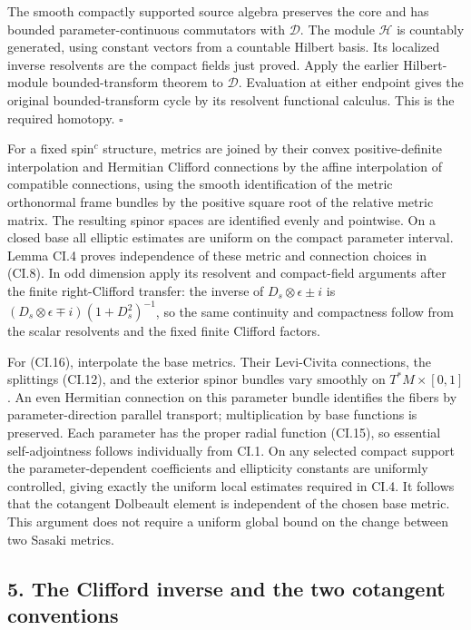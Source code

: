 \documentclass[
  11pt,
]{article}
\begin{document}
The smooth compactly supported source algebra preserves the core and has
bounded parameter-continuous commutators with \(\mathcal D\). The module
\(\mathcal H\) is countably generated, using constant vectors from a
countable Hilbert basis. Its localized inverse resolvents are the
compact fields just proved. Apply the earlier Hilbert-module
bounded-transform theorem to \(\mathcal D\). Evaluation at either
endpoint gives the original bounded-transform cycle by its resolvent
functional calculus. This is the required homotopy. \(\square\)

For a fixed spin\(^{c}\) structure, metrics are joined by their convex
positive-definite interpolation and Hermitian Clifford connections by
the affine interpolation of compatible connections, using the smooth
identification of the metric orthonormal frame bundles by the positive
square root of the relative metric matrix. The resulting spinor spaces
are identified evenly and pointwise. On a closed base all elliptic
estimates are uniform on the compact parameter interval. Lemma CI.4
proves independence of these metric and connection choices in (CI.8). In
odd dimension apply its resolvent and compact-field arguments after the
finite right-Clifford transfer: the inverse of
\(D_s\otimes\epsilon\pm i\) is
\((D_s\otimes\epsilon\mp i)(1+D_s^2)^{-1}\), so the same continuity and
compactness follow from the scalar resolvents and the fixed finite
Clifford factors.

For (CI.16), interpolate the base metrics. Their Levi-Civita
connections, the splittings (CI.12), and the exterior spinor bundles
vary smoothly on \(T^*M\times[0,1]\). An even Hermitian connection on
this parameter bundle identifies the fibers by parameter-direction
parallel transport; multiplication by base functions is preserved. Each
parameter has the proper radial function (CI.15), so essential
self-adjointness follows individually from CI.1. On any selected compact
support the parameter-dependent coefficients and ellipticity constants
are uniformly controlled, giving exactly the uniform local estimates
required in CI.4. It follows that the cotangent Dolbeault element is
independent of the chosen base metric. This argument does not require a
uniform global bound on the change between two Sasaki metrics.

\subsection{5. The Clifford inverse and the two cotangent
conventions}\label{the-clifford-inverse-and-the-two-cotangent-conventions}
\end{document}
